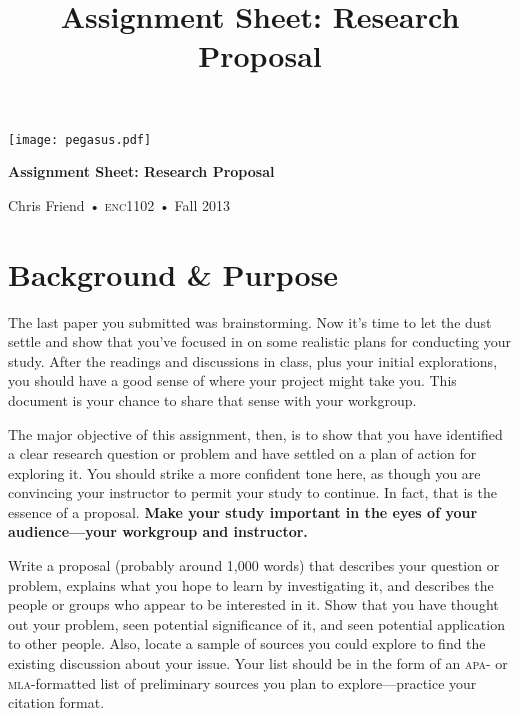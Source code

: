 \documentclass[11pt]{amsart}	%
\title[Research Proposal]{Assignment Sheet: Research Proposal}
\begin{document}
%
\thispagestyle{empty}

\vspace{-2in}
\begin{center}
\huge
\texttt{[image: pegasus.pdf]}

\textbf{Assignment Sheet: Research Proposal}

{\normalsize Chris Friend • \textsc{enc1102} • Fall 2013}
\end{center}
\vspace{1.5\baselineskip}

\section{Background \& Purpose} %
\label{sec:background}
The last paper you submitted was brainstorming. Now it's time to let the dust settle and show that you've focused in on some realistic plans for conducting your study. After the readings and discussions in class, plus your initial explorations, you should have a good sense of where your project might take you. This document is your chance to share that sense with your workgroup.

The major objective of this assignment, then, is to show that you have identified a clear research question or problem and have settled on a plan of action for exploring it. You should strike a more confident tone here, as though you are convincing your instructor to permit your study to continue. In fact, that is the essence of a proposal. \textbf{Make your study important in the eyes of your audience—your workgroup and instructor.}

Write a proposal (probably around 1,000 words) that describes your question or problem, explains what you hope to learn by investigating it, and describes the people or groups who appear to be interested in it. Show that you have thought out your problem, seen potential significance of it, and seen potential application to other people. Also, locate a sample of sources you could explore to find the existing discussion about your issue. Your list should be in the form of an \textsc{apa}- or \textsc{mla}-formatted list of preliminary sources you plan to explore---practice your citation format.
\end{document}
